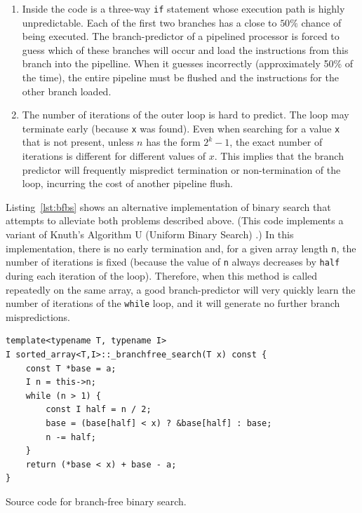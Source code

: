 \documentclass{patmorin}
\newcommand{\lstlabel}[1]{\label{lst:#1}}
\newcommand{\lstref}[1]{Listing~\ref{lst:#1}}
\newcommand{\Lstref}[1]{\lstref{#1}}
\begin{document}
\begin{enumerate}

\item Inside the code is a three-way \texttt{if} statement whose
execution path is highly unpredictable. Each of the first two branches
has a close to $50\%$ chance of being executed.  The branch-predictor of
a pipelined processor is forced to guess which of these branches will
occur and load the instructions from this branch into the pipelline.
When it guesses incorrectly (approximately 50\% of the time), the entire
pipeline must be flushed and the instructions for the other branch loaded.

\item The number of iterations of the outer loop is hard to predict. The
loop may terminate early (because \texttt{x} was found). Even when
searching for a value \texttt{x} that is not present, unless $n$ has
the form $2^k-1$, the exact number of iterations is different for different
values of $x$.  This implies that the branch predictor will frequently
mispredict termination or non-termination of the loop, incurring the
cost of another pipeline flush.

\end{enumerate}

\Lstref{bfbs} shows an alternative implementation of binary search
that attempts to alleviate both problems described above. (This
code implements a variant of Knuth's Algorithm U (Uniform Binary Search)
\cite[Section~6.2.1]{knuth:art}.)  In this implementation, there is no
early termination and, for a given array length \texttt{n}, the
number of iterations is fixed (because the value of \texttt{n}
always decreases by \texttt{half} during each iteration of
the loop).  Therefore, when this method is called repeatedly on the
same array, a good branch-predictor will very quickly learn the number
of iterations of the \texttt{while} loop, and it will generate
no further branch mispredictions.

\begin{listing}
\begin{verbatim}
template<typename T, typename I>
I sorted_array<T,I>::_branchfree_search(T x) const {
    const T *base = a;
    I n = this->n;
    while (n > 1) {
        const I half = n / 2;
        base = (base[half] < x) ? &base[half] : base;
        n -= half;
    }
    return (*base < x) + base - a;
}
\end{verbatim}
\caption{Source code for branch-free binary search.}
\lstlabel{bfbs}
\end{listing}
\end{document}
